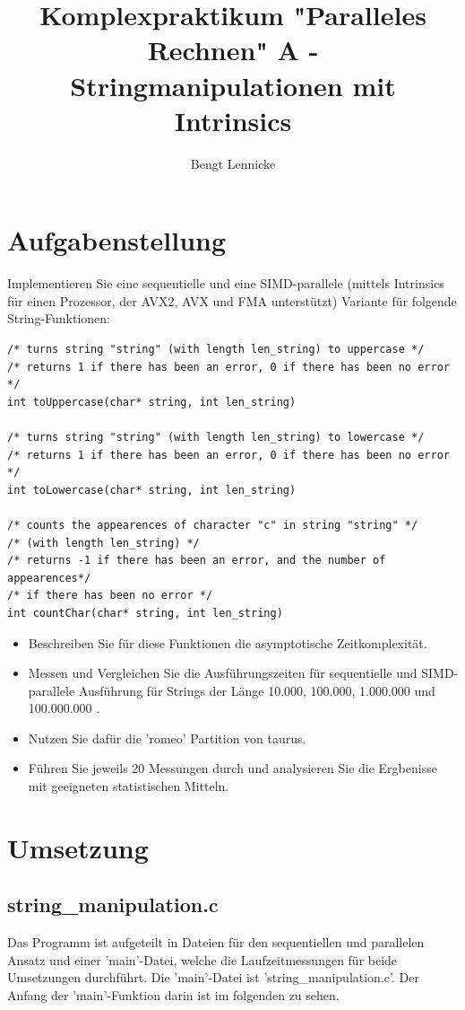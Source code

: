 \documentclass[plainarticle,zihtitle,german,final,hyperref,utf8]{zihpub}
\author{Bengt Lennicke}
\title{Komplexpraktikum "Paralleles Rechnen" \newline A - Stringmanipulationen mit Intrinsics}
\begin{document}
\section{Aufgabenstellung}

Implementieren Sie eine sequentielle und eine SIMD-parallele (mittels Intrinsics für einen Prozessor, der AVX2, AVX und FMA unterstützt) Variante für folgende String-Funktionen:
\begin{verbatim}
/* turns string "string" (with length len_string) to uppercase */
/* returns 1 if there has been an error, 0 if there has been no error */
int toUppercase(char* string, int len_string)

/* turns string "string" (with length len_string) to lowercase */
/* returns 1 if there has been an error, 0 if there has been no error */
int toLowercase(char* string, int len_string)

/* counts the appearences of character "c" in string "string" */
/* (with length len_string) */
/* returns -1 if there has been an error, and the number of appearences*/
/* if there has been no error */
int countChar(char* string, int len_string)
\end{verbatim}
\begin{itemize}
	\item Beschreiben Sie für diese Funktionen die asymptotische Zeitkomplexität.
	\item Messen und Vergleichen Sie die Ausführungszeiten für sequentielle und SIMD-parallele Ausführung für Strings der Länge 10.000, 100.000, 1.000.000 und 100.000.000 .
	\item Nutzen Sie dafür die 'romeo' Partition von taurus.
	\item Führen Sie jeweils 20 Messungen durch und analysieren Sie die Ergbenisse mit geeigneten statistischen Mitteln.
	
\end{itemize}

\section{Umsetzung}
\subsection{string\_manipulation.c}
Das Programm ist aufgeteilt in Dateien für den sequentiellen und parallelen Ansatz und einer 'main'-Datei, welche die Laufzeitmessungen für beide Umsetzungen durchführt. Die 'main'-Datei ist 'string\_manipulation.c'. Der Anfang der 'main'-Funktion darin ist im folgenden zu sehen.
\end{document}
